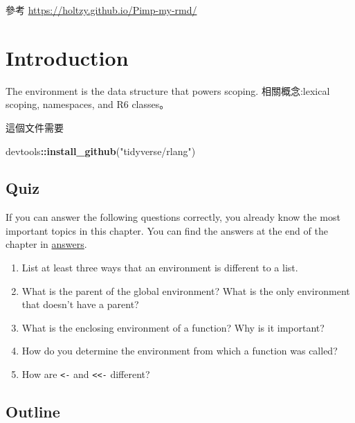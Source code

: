 \documentclass[]{book}
\newenvironment{Shaded}{\begin{snugshade}}{\end{snugshade}}
\newcommand{\KeywordTok}[1]{\textcolor[rgb]{0.13,0.29,0.53}{\textbf{#1}}}
\newcommand{\NormalTok}[1]{#1}
\newcommand{\OperatorTok}[1]{\textcolor[rgb]{0.81,0.36,0.00}{\textbf{#1}}}
\newcommand{\StringTok}[1]{\textcolor[rgb]{0.31,0.60,0.02}{#1}}
\theoremstyle{definition}
\theoremstyle{definition}
\theoremstyle{definition}
\theoremstyle{remark}
\begin{document}
參考 \url{https://holtzy.github.io/Pimp-my-rmd/}

\hypertarget{introduction-1}{%
\section{Introduction}\label{introduction-1}}

The environment is the data structure that powers scoping.
相關概念:lexical scoping, namespaces, and R6 classes。

這個文件需要

\begin{Shaded}
\begin{Highlighting}[]
\NormalTok{devtools}\OperatorTok{::}\KeywordTok{install_github}\NormalTok{(}\StringTok{"tidyverse/rlang"}\NormalTok{)}
\end{Highlighting}
\end{Shaded}

\hypertarget{quiz}{%
\subsection*{Quiz}\label{quiz}}

If you can answer the following questions correctly, you already know
the most important topics in this chapter. You can find the answers at
the end of the chapter in \protect\hyperlink{env-answers}{answers}.

\begin{enumerate}
\def\labelenumi{\arabic{enumi}.}
\item
  List at least three ways that an environment is different to a list.
\item
  What is the parent of the global environment? What is the only
  environment that doesn't have a parent?
\item
  What is the enclosing environment of a function? Why is it important?
\item
  How do you determine the environment from which a function was called?
\item
  How are \texttt{\textless{}-} and \texttt{\textless{}\textless{}-}
  different?
\end{enumerate}

\hypertarget{outline-1}{%
\subsection*{Outline}\label{outline-1}}
\end{document}

